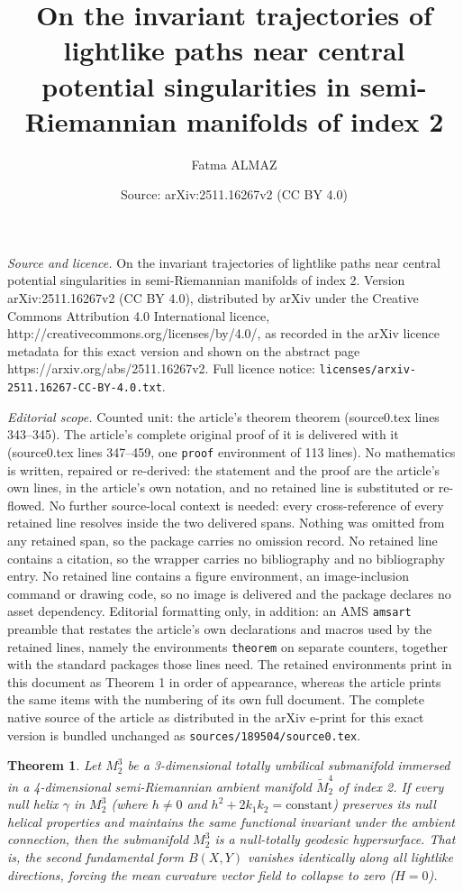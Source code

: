 \documentclass[10pt,a4paper]{amsart}
\title{On the invariant trajectories of lightlike paths near central potential singularities in semi-Riemannian manifolds of index 2}
\author{Fatma ALMAZ}
\date{Source: arXiv:2511.16267v2 (CC BY 4.0)}
\newtheorem{theorem}{Theorem}
\begin{document}
\maketitle

\noindent\emph{Source and licence.} On the invariant trajectories of lightlike paths near central potential singularities in semi-Riemannian manifolds of index 2. Version arXiv:2511.16267v2 (CC BY 4.0), distributed by arXiv under the Creative Commons Attribution 4.0 International licence, http://creativecommons.org/licenses/by/4.0/, as recorded in the arXiv licence metadata for this exact version and shown on the abstract page https://arxiv.org/abs/2511.16267v2. Full licence notice: \texttt{licenses/arxiv-2511.16267-CC-BY-4.0.txt}.\par\smallskip

\noindent\textit{Editorial scope.} Counted unit: the article's theorem theorem (source0.tex lines 343--345). The article's complete original proof of it is delivered with it (source0.tex lines 347--459, one \texttt{proof} environment of 113 lines). No mathematics is written, repaired or re-derived: the statement and the proof are the article's own lines, in the article's own notation, and no retained line is substituted or re-flowed.  No further source-local context is needed: every cross-reference of every retained line resolves inside the two delivered spans.  Nothing was omitted from any retained span, so the package carries no omission record.  No retained line contains a citation, so the wrapper carries no bibliography and no bibliography entry.  No retained line contains a figure environment, an image-inclusion command or drawing code, so no image is delivered and the package declares no asset dependency.  Editorial formatting only, in addition: an AMS \texttt{amsart} preamble that restates the article's own declarations and macros used by the retained lines, namely the environments \texttt{theorem} on separate counters, together with the standard packages those lines need.  The retained environments print in this document as Theorem 1 in order of appearance, whereas the article prints the same items with the numbering of its own full document.  The complete native source of the article as distributed in the arXiv e-print for this exact version is bundled unchanged as \texttt{sources/189504/source0.tex}.
\begin{theorem}
Let $M_2^3$ be a 3-dimensional totally umbilical submanifold immersed in a 4-dimensional semi-Riemannian ambient manifold $\tilde{M}_2^4$ of index 2. If every null helix $\gamma$ in $M_2^3$ (where $h \neq 0$ and $h^2+2k_1 k_2=\text{constant}$) preserves its null helical properties and maintains the same functional invariant under the ambient connection, then the submanifold $M_2^3$ is a null-totally geodesic hypersurface. That is, the second fundamental form $B(X,Y)$ vanishes identically along all lightlike directions, forcing the mean curvature vector field to collapse to zero ($H = 0$).
\end{theorem}
\end{document}
